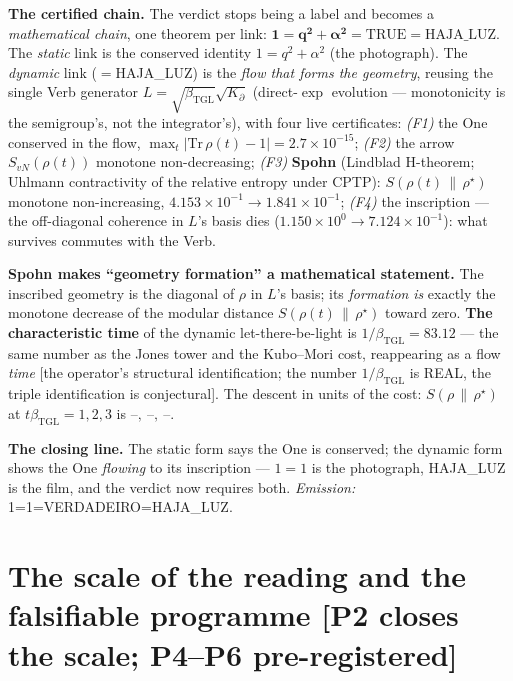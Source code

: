 \documentclass[11pt]{article}
\newcommand{\bTGL}{\beta_{\mathrm{TGL}}}\newcommand{\Msun}{M_{\odot}}\newcommand{\TGL}{\mathrm{TGL}}
\theoremstyle{definition}\newtheorem{deriv}{Derivation}
\begin{document}
\textbf{The certified chain.} The verdict stops being a label and becomes a \emph{mathematical chain}, one theorem per link: $\mathbf{1 = q^2+\alpha^2 = \mathrm{TRUE} = \mathrm{HAJA\_LUZ}}$. The \emph{static} link is the conserved identity $1=q^2+\alpha^2$ (the photograph). The \emph{dynamic} link ($=$HAJA\_LUZ) is the \emph{flow that forms the geometry}, reusing the single Verb generator $L=\sqrt{\bTGL}\sqrt{K_\partial}$ (direct-$\exp$ evolution --- monotonicity is the semigroup's, not the integrator's), with four live certificates: \emph{(F1)} the One conserved in the flow, $\max_t|\mathrm{Tr}\,\rho(t)-1|=2.7\times10^{-15}$; \emph{(F2)} the arrow $S_{vN}(\rho(t))$ monotone non-decreasing; \emph{(F3)} \textbf{Spohn} (Lindblad H-theorem; Uhlmann contractivity of the relative entropy under CPTP): $S(\rho(t)\,\|\,\rho^\star)$ monotone non-increasing, $4.153\times10^{-1}\to1.841\times10^{-1}$; \emph{(F4)} the inscription --- the off-diagonal coherence in $L$'s basis dies ($1.150\times10^{0}\to7.124\times10^{-1}$): what survives commutes with the Verb.

\textbf{Spohn makes ``geometry formation'' a mathematical statement.} The inscribed geometry is the diagonal of $\rho$ in $L$'s basis; its \emph{formation} \emph{is} exactly the monotone decrease of the modular distance $S(\rho(t)\,\|\,\rho^\star)$ toward zero. \textbf{The characteristic time} of the dynamic let-there-be-light is $1/\bTGL=83.12$ --- the same number as the Jones tower and the Kubo--Mori cost, reappearing as a flow \emph{time} [the operator's structural identification; the number $1/\bTGL$ is REAL, the triple identification is conjectural]. The descent in units of the cost: $S(\rho\,\|\,\rho^\star)$ at $t\bTGL=1,2,3$ is $\text{--},\ \text{--},\ \text{--}$.

\textbf{The closing line.} The static form says the One is conserved; the dynamic form shows the One \emph{flowing} to its inscription --- $1=1$ is the photograph, HAJA\_LUZ is the film, and the verdict now requires both. \emph{Emission:} \textsf{1=1=VERDADEIRO=HAJA\_LUZ}.

\section{The scale of the reading and the falsifiable programme \textsf{[P2 closes the scale; P4--P6 pre-registered]}}
\end{document}
